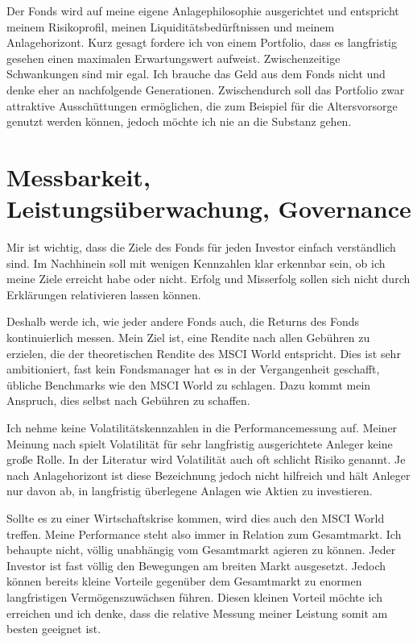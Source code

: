 \documentclass{article}
\begin{document}
Der Fonds wird auf meine eigene Anlagephilosophie ausgerichtet und entspricht meinem Risikoprofil, meinen Liquiditätsbedürftnissen und meinem Anlagehorizont. Kurz gesagt fordere ich von einem Portfolio, dass es langfristig gesehen einen maximalen Erwartungswert aufweist. Zwischenzeitige Schwankungen sind mir egal. Ich brauche das Geld aus dem Fonds nicht und denke eher an nachfolgende Generationen. Zwischendurch soll das Portfolio zwar attraktive Ausschüttungen ermöglichen, die zum Beispiel für die Altersvorsorge genutzt werden können, jedoch möchte ich nie an die Substanz gehen.

\section{Messbarkeit, Leistungsüberwachung, Governance}

Mir ist wichtig, dass die Ziele des Fonds für jeden Investor einfach verständlich sind. Im Nachhinein soll mit wenigen Kennzahlen klar erkennbar sein, ob ich meine Ziele erreicht habe oder nicht. Erfolg und Misserfolg sollen sich nicht durch Erklärungen relativieren lassen können.

Deshalb werde ich, wie jeder andere Fonds auch, die Returns des Fonds kontinuierlich messen. Mein Ziel ist, eine Rendite nach allen Gebühren zu erzielen, die der theoretischen Rendite des MSCI World entspricht. Dies ist sehr ambitioniert, fast kein Fondsmanager hat es in der Vergangenheit geschafft, übliche Benchmarks wie den MSCI World zu schlagen. Dazu kommt mein Anspruch, dies selbst nach Gebühren zu schaffen.

Ich nehme keine Volatilitätskennzahlen in die Performancemessung auf. Meiner Meinung nach spielt Volatilität für sehr langfristig ausgerichtete Anleger keine große Rolle. In der Literatur wird Volatilität auch oft schlicht Risiko genannt. Je nach Anlagehorizont ist diese Bezeichnung jedoch nicht hilfreich und hält Anleger nur davon ab, in langfristig überlegene Anlagen wie Aktien zu investieren.

Sollte es zu einer Wirtschaftskrise kommen, wird dies auch den MSCI World treffen. Meine Performance steht also immer in Relation zum Gesamtmarkt. Ich behaupte nicht, völlig unabhängig vom Gesamtmarkt agieren zu können. Jeder Investor ist fast völlig den Bewegungen am breiten Markt ausgesetzt. Jedoch können bereits kleine Vorteile gegenüber dem Gesamtmarkt zu enormen langfristigen Vermögenszuwächsen führen. Diesen kleinen Vorteil möchte ich erreichen und ich denke, dass die relative Messung meiner Leistung somit am besten geeignet ist.
\end{document}
